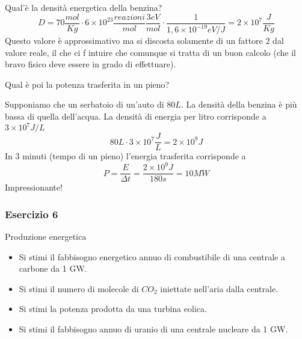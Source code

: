 Qual'è la densità energetica della benzina?
\begin{equation}
D=70\frac{mol}{Kg}\cdot 6\times 10^{23}\frac{reazioni}{mol}\frac{3eV}{mol}\cdot \frac{1}{1,6\times 10^{-19}eV/J}=2\times 10^7\frac{J}{Kg}
\end{equation}
Questo valore è approssimativo ma si discosta solamente di un fattore 2 dal valore reale, il che ci f intuire che comunque si tratta di un buon calcolo (che il bravo fisico deve essere in grado di effettuare).

Qual è poi la potenza trasferita in un pieno?

Supponiamo che un serbatoio di un'auto di $80L$. La densità della benzina è più bassa di quella dell'acqua. 
La densità di energia per litro corrisponde a $3\times10^7J/L$
\begin{equation}
80L\cdot 3\times10^7\frac{J}{L}=2\times10^9J
\end{equation}
In 3 minuti (tempo di un pieno) l'energia trasferita corrisponde a 
\begin{equation}
P=\frac{E}{\Delta t}=\frac{2\times10^9J}{180s}=10MW
\end{equation}
Impressionante!

\newpage
\subsubsection{Esercizio 6}
Produzione energetica
\begin{itemize}
\item Si stimi il fabbisogno energetico annuo di combustibile di una centrale a carbone da 1 GW.
\item Si stimi il numero di molecole di $CO_2$ iniettate nell'aria dalla centrale.
\item Si stimi la potenza prodotta da una turbina eolica.
\item Si stimi il fabbisogno annuo di uranio di una centrale nucleare da 1 GW.
\end{itemize}


